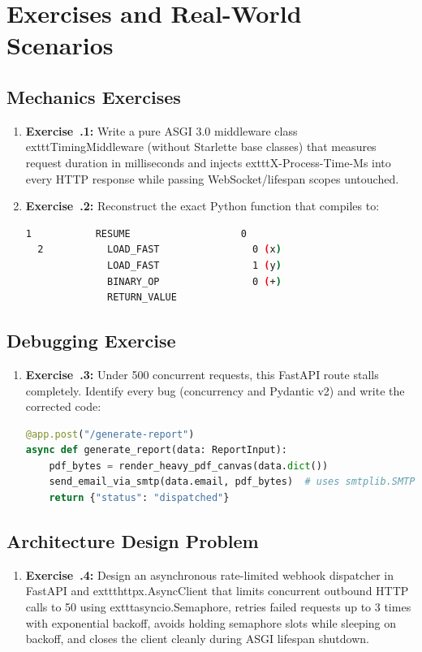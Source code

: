 \section{Exercises and Real-World Scenarios}

\subsection{Mechanics Exercises}
\begin{enumerate}[leftmargin=15pt]
  \item \textbf{Exercise~\thechapter.1:} Write a pure ASGI 3.0 middleware class 	exttt{TimingMiddleware} (without Starlette base classes) that measures request duration in milliseconds and injects 	exttt{X-Process-Time-Ms} into every HTTP response while passing WebSocket/lifespan scopes untouched.
  \item \textbf{Exercise~\thechapter.2:} Reconstruct the exact Python function that compiles to:
\begin{lstlisting}[language=sh]
  1           RESUME                   0
  2           LOAD_FAST                0 (x)
              LOAD_FAST                1 (y)
              BINARY_OP                0 (+)
              RETURN_VALUE
\end{lstlisting}
\end{enumerate}

\subsection{Debugging Exercise}
\begin{enumerate}[leftmargin=15pt]
  \item \textbf{Exercise~\thechapter.3:} Under 500 concurrent requests, this FastAPI route stalls completely. Identify every bug (concurrency and Pydantic v2) and write the corrected code:
\begin{lstlisting}[language=Python]
@app.post("/generate-report")
async def generate_report(data: ReportInput):
    pdf_bytes = render_heavy_pdf_canvas(data.dict())
    send_email_via_smtp(data.email, pdf_bytes)  # uses smtplib.SMTP
    return {"status": "dispatched"}
\end{lstlisting}
\end{enumerate}

\subsection{Architecture Design Problem}
\begin{enumerate}[leftmargin=15pt]
  \item \textbf{Exercise~\thechapter.4:} Design an asynchronous rate-limited webhook dispatcher in FastAPI and 	exttt{httpx.AsyncClient} that limits concurrent outbound HTTP calls to 50 using 	exttt{asyncio.Semaphore}, retries failed requests up to 3 times with exponential backoff, avoids holding semaphore slots while sleeping on backoff, and closes the client cleanly during ASGI lifespan shutdown.
\end{enumerate}

